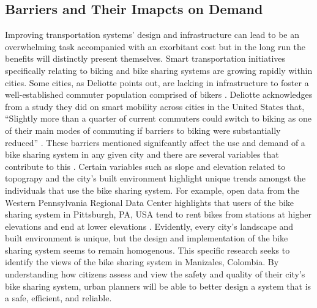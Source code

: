 \documentclass[12pt]{article}
\begin{document}
\subsection*{Barriers and Their Imapcts on Demand}
Improving transportation systems’ design and infrastructure can lead to be an 
overwhelming task accompanied with an exorbitant cost but in the long run the benefits will distinctly present themselves. 
Smart transportation initiatives specifically relating to biking and bike sharing systems are growing rapidly within
cities. Some cities, as Deliotte points out, are lacking in infrastructure to foster a well-established commuter population comprised of 
bikers \cite{DeliotteReport}. Deliotte acknowledges from a study they did on smart mobility across cities in the United States that, “Slightly 
more than a quarter of current commuters could switch to biking as one of their main modes of commuting if barriers 
to biking were substantially reduced” \cite{DeliotteReport}. These barriers mentioned signifcantly affect the use and demand of a bike sharing system in any given city and 
there are several variables that contribute to this \cite{ReviewonBike-sharing}. Certain variables such as slope and elevation related to topograpy and the city's built environment
highlight unique trends amongst the individuals that use the bike sharing system. For example, open data from the Western Pennsylvania Regional Data Center
highlights that users of the bike sharing system in Pittsburgh, PA, USA tend to rent bikes from stations at higher elevations and end at lower elevations \cite{HealthyRidePGHPSG}. Evidently,
every city's landscape and built environment is unique, but the design and implementation of the bike sharing system seems to remain homogenous. This specific research seeks to identify the views
of the bike sharing system in Manizales, Colombia. By understanding how citizens assess and view the 
safety and quality of their city's bike sharing system, urban planners will be able to better design a system that is a safe, efficient, and reliable.
\end{document}

